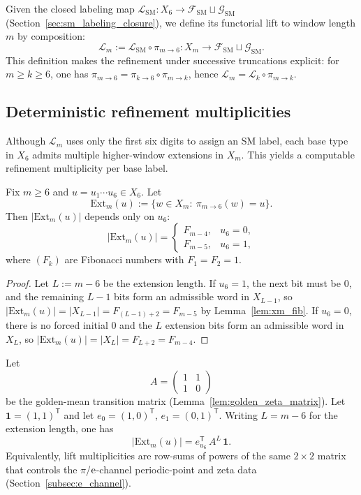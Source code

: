 Given the closed labeling map $\mathcal{L}_{\mathrm{SM}}:X_6\to \mathcal{F}_{\mathrm{SM}}\sqcup\mathcal{G}_{\mathrm{SM}}$ (Section~\ref{sec:sm_labeling_closure}),
we define its functorial lift to window length $m$ by composition:
\[
\mathcal{L}_m:=\mathcal{L}_{\mathrm{SM}}\circ \pi_{m\to 6}:X_m\to \mathcal{F}_{\mathrm{SM}}\sqcup\mathcal{G}_{\mathrm{SM}}.
\]
This definition makes the refinement under successive truncations explicit:
for $m\ge k\ge 6$, one has $\pi_{m\to 6}=\pi_{k\to 6}\circ \pi_{m\to k}$, hence $\mathcal{L}_m=\mathcal{L}_k\circ \pi_{m\to k}$.

\subsection{Deterministic refinement multiplicities}

Although $\mathcal{L}_m$ uses only the first six digits to assign an SM label, each base type in $X_6$ admits multiple higher-window extensions in $X_m$.
This yields a computable refinement multiplicity per base label.

\begin{proposition}\label{prop:prefix_extension_count}
Fix $m\ge 6$ and $u=u_1\cdots u_6\in X_6$.
Let
\[
\mathrm{Ext}_m(u):=\{w\in X_m:\ \pi_{m\to 6}(w)=u\}.
\]
Then $|\mathrm{Ext}_m(u)|$ depends only on $u_6$:
\[
|\mathrm{Ext}_m(u)|=
\begin{cases}
F_{m-4}, & u_6=0,\\
F_{m-5}, & u_6=1,
\end{cases}
\]
where $(F_k)$ are Fibonacci numbers with $F_1=F_2=1$.
\end{proposition}
\begin{proof}
Let $L:=m-6$ be the extension length.
If $u_6=1$, the next bit must be $0$, and the remaining $L-1$ bits form an admissible word in $X_{L-1}$, so $|\mathrm{Ext}_m(u)|=|X_{L-1}|=F_{(L-1)+2}=F_{m-5}$ by Lemma~\ref{lem:xm_fib}.
If $u_6=0$, there is no forced initial $0$ and the $L$ extension bits form an admissible word in $X_L$, so $|\mathrm{Ext}_m(u)|=|X_L|=F_{L+2}=F_{m-4}$.
\end{proof}

\begin{remark}\label{rem:extension_counts_matrix_view}
\MathTag Let
\[
A=\begin{pmatrix}1&1\\ 1&0\end{pmatrix}
\]
be the golden-mean transition matrix (Lemma~\ref{lem:golden_zeta_matrix}).
Let $\mathbf{1}=(1,1)^{\mathsf{T}}$ and let $e_0=(1,0)^{\mathsf{T}}$, $e_1=(0,1)^{\mathsf{T}}$.
Writing $L=m-6$ for the extension length, one has
\[
|\mathrm{Ext}_m(u)|=e_{u_6}^{\mathsf{T}}\,A^{L}\,\mathbf{1}.
\]
Equivalently, lift multiplicities are row-sums of powers of the same $2\times2$ matrix that controls the $\pi$/$\mathrm{e}$-channel periodic-point and zeta data (Section~\ref{subsec:e_channel}).
\end{remark}

